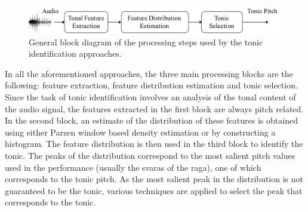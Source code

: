 \begin{figure}
	\begin{center}
		\includegraphics[width=\figSizeNinetyFive]{ch02_background/figures/tonic_identification_block_diagram.pdf}
	\end{center}
	\caption[General block diagram of the tonic identification approaches]{General block diagram of the processing steps used by the tonic identification approaches.}
	\label{fig:tonic_identification_general_block_diagram}
\end{figure}

In all the aforementioned approaches, the three main processing blocks are the following: feature extraction, feature distribution estimation and tonic selection. Since the task of tonic identification involves an analysis of the tonal content of the audio signal, the features extracted in the first block are always pitch related. In the second block, an estimate of the distribution of these features is obtained using either Parzen window based density estimation or by constructing a histogram. The feature distribution is then used in the third block to identify the tonic. The peaks of the distribution correspond to the most salient pitch values used in the performance (usually the \glspl{svara} of the \gls{raga}), one of which corresponds to the tonic pitch. As the most salient peak in the distribution is not guaranteed to be the tonic, various techniques are applied to select the peak that corresponds to the tonic.



